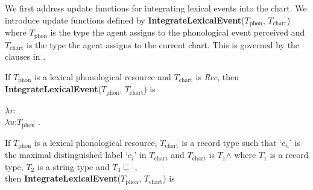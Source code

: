 We first address update functions for integrating lexical events into
the chart.  We introduce update functions defined by
\textbf{IntegrateLexicalEvent}($T_{\mathrm{phon}}$,
$T_{\mathrm{chart}}$) where $T_{\mathrm{phon}}$ is the type the agent
assigns to the
phonological event perceived and $T_{\mathrm{chart}}$ is the type the
agent assigns to the current chart.  This is governed by the clauses
in \nexteg{}.
\begin{ex} 
\begin{subex} 
 
\item If $T_{\mathrm{phon}}$ is a lexical phonological resource and
  $T_{\mathrm{chart}}$ is \textit{Rec}, then
  \textbf{IntegrateLexicalEvent}($T_{\mathrm{phon}}$,
  $T_{\mathrm{chart}}$) is

$\lambda
r$:
\\
\hspace*{1em} $\lambda u$:$T_{\mathrm{phon}}$ . \\
\hspace*{2em}


 
\item If $T_{\mathrm{phon}}$ is a lexical phonological resource,
  $T_{\mathrm{chart}}$ is a record type such that `e$_n$' is the maximal
  distinguished label `e$_i$' in $T_{\mathrm{chart}}$ and
  $T_{\mathrm{chart}}$ is
  $T_1$\d{$\wedge$}
  where $T_1$ is a record type, $T_2$ is a string type and
  $T_3\sqsubseteq$ , \\
then
  \textbf{IntegrateLexicalEvent}($T_{\mathrm{phon}}$,
  $T_{\mathrm{chart}}$) is


\end{subex}
\end{ex}
